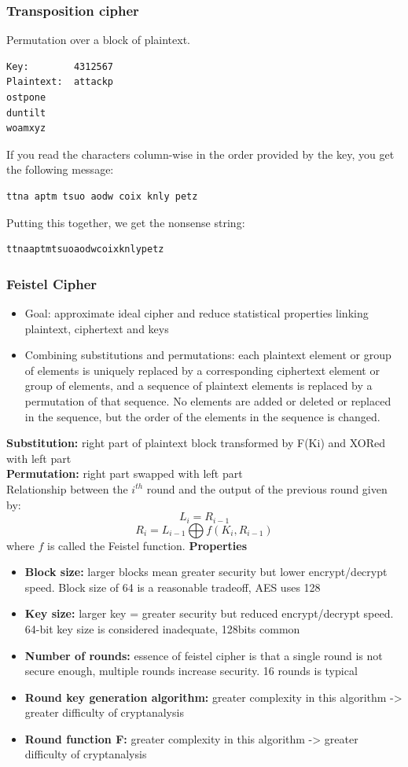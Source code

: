 \documentclass{article}
\begin{document}
\subsubsection{Transposition cipher}
Permutation over a block of plaintext.
\begin{verbatim}
Key:        4312567
Plaintext:  attackp
ostpone
duntilt
woamxyz
\end{verbatim}
If you read the characters column-wise in the order provided by the key, you get the following message:
\begin{verbatim}
ttna aptm tsuo aodw coix knly petz
\end{verbatim}
Putting this together, we get the nonsense string:
\begin{verbatim}
ttnaaptmtsuoaodwcoixknlypetz
\end{verbatim}
\subsubsection{Feistel Cipher}
\begin{itemize}
    \item Goal: approximate ideal cipher and reduce statistical properties linking plaintext, ciphertext and keys
    \item Combining substitutions and permutations: each plaintext element or group of elements is uniquely replaced by a corresponding ciphertext element or group of elements, and a sequence of plaintext elements is replaced by a permutation of that sequence. No elements are added or deleted or replaced in the sequence, but the order of the elements in the sequence is changed.
\end{itemize}
\textbf{Substitution:} right part of plaintext block transformed by F(Ki) and XORed with left part
\\\textbf{Permutation:} right part swapped with left part
\\Relationship between the $i^{th}$ round and the output of the previous round given by:
$$L_i = R_{i-1}$$
$$R_i = L_{i-1}\bigoplus f(K_i, R_{i-1})$$
where $f$ is called the Feistel function.
\textbf{Properties}
\begin{itemize}
    \item \textbf{Block size:} larger blocks mean greater security but lower encrypt/decrypt speed. Block size of 64 is a reasonable tradeoff, AES uses 128
    \item \textbf{Key size:} larger key = greater security but reduced encrypt/decrypt speed. 64-bit key size is considered inadequate, 128bits common
    \item \textbf{Number of rounds:} essence of feistel cipher is that a single round is not secure enough, multiple rounds increase security. 16 rounds is typical
    \item \textbf{Round key generation algorithm:} greater complexity in this algorithm -> greater difficulty of cryptanalysis
    \item \textbf{Round function F:} greater complexity in this algorithm -> greater difficulty of cryptanalysis
\end{itemize}
\end{document}
